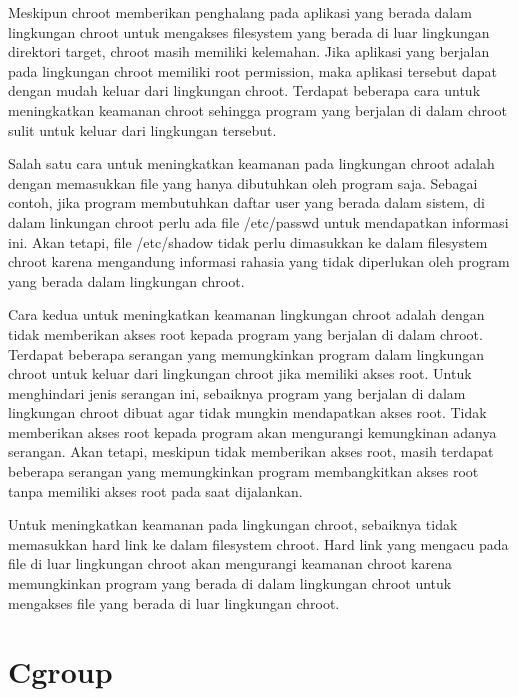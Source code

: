 \par Meskipun chroot memberikan penghalang pada aplikasi yang berada dalam lingkungan chroot untuk mengakses filesystem yang berada di luar lingkungan direktori target, chroot masih memiliki kelemahan. Jika aplikasi yang berjalan pada lingkungan chroot memiliki root permission, maka aplikasi tersebut dapat dengan mudah keluar dari lingkungan chroot. Terdapat beberapa cara untuk meningkatkan keamanan chroot sehingga program yang berjalan di dalam chroot sulit  untuk keluar dari lingkungan tersebut.

\par Salah satu cara untuk meningkatkan keamanan pada lingkungan chroot adalah dengan memasukkan file yang hanya dibutuhkan oleh program saja. Sebagai contoh, jika program membutuhkan daftar user yang berada dalam sistem, di dalam linkungan chroot perlu ada file /etc/passwd untuk mendapatkan informasi ini. Akan tetapi, file /etc/shadow tidak perlu dimasukkan ke dalam filesystem chroot karena mengandung informasi rahasia yang tidak diperlukan oleh program yang berada dalam lingkungan chroot.

\par Cara kedua untuk meningkatkan keamanan lingkungan chroot adalah dengan tidak memberikan akses root kepada program yang berjalan di dalam chroot. Terdapat beberapa serangan yang memungkinkan program dalam lingkungan chroot untuk keluar dari lingkungan chroot jika memiliki akses root. Untuk menghindari jenis serangan ini, sebaiknya program yang berjalan di dalam lingkungan chroot dibuat agar tidak mungkin mendapatkan akses root. Tidak memberikan akses root kepada program akan mengurangi kemungkinan adanya serangan. Akan tetapi, meskipun tidak memberikan akses root, masih terdapat beberapa serangan yang memungkinkan program membangkitkan akses root tanpa memiliki akses root pada saat dijalankan.

\par Untuk meningkatkan keamanan pada lingkungan chroot, sebaiknya tidak memasukkan hard link ke dalam filesystem chroot. Hard link yang mengacu pada file di luar lingkungan chroot akan mengurangi keamanan chroot karena memungkinkan program yang berada di dalam lingkungan chroot untuk mengakses file yang berada di luar lingkungan chroot.

\section{Cgroup}

